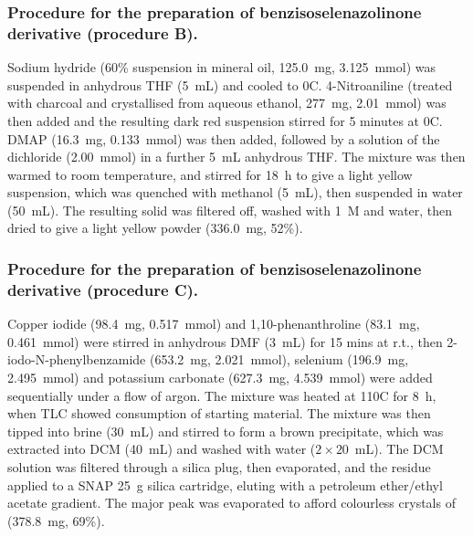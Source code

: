 \begin{refsection}
\subsubsection[General procedure B]{Procedure for the preparation of benzisoselenazolinone derivative  (procedure B).}
Sodium hydride (60\% suspension in mineral oil, 125.0~mg, 3.125~mmol) was suspended in anhydrous THF (5~mL) and cooled to 0\degree{}C.
4-Nitroaniline (treated with charcoal and crystallised from aqueous ethanol, 277~mg, 2.01~mmol) was then added and the resulting dark red suspension stirred for 5 minutes at 0\degree{}C.
DMAP (16.3~mg, 0.133~mmol) was then added, followed by a solution of the dichloride  (2.00~mmol) in a further 5~mL anhydrous THF.\@
The mixture was then warmed to room temperature, and stirred for 18~h to give a light yellow suspension, which was quenched with methanol (5~mL), then suspended in water (50~mL).
The resulting solid was filtered off, washed with 1~M  and water, then dried to give a light yellow powder (336.0~mg, 52\%).

\subsubsection[General procedure C]{Procedure for the preparation of benzisoselenazolinone derivative  (procedure C).}
Copper iodide (98.4~mg, 0.517~mmol) and 1,10-phenanthroline (83.1~mg, 0.461~mmol) were stirred in anhydrous DMF (3~mL) for 15 mins at r.t., then 2-iodo-N-phenylbenz\-amide (653.2~mg, 2.021~mmol), selenium (196.9~mg, 2.495~mmol) and potassium carbonate (627.3~mg, 4.539~mmol) were added sequentially under a flow of argon.
The mixture was heated at 110\degree{}C for 8~h, when TLC showed consumption of starting material.
The mixture was then tipped into brine (30~mL) and stirred to form a brown precipitate, which was extracted into DCM (40~mL) and washed with water ($ 2 \times 20 $~mL).
The DCM solution was filtered through a silica plug, then evaporated, and the residue applied to a SNAP 25~g silica cartridge, eluting with a petroleum ether/ethyl acetate gradient.
The major peak was evaporated to afford colourless crystals of  (378.8~mg, 69\%).


\end{refsection}

